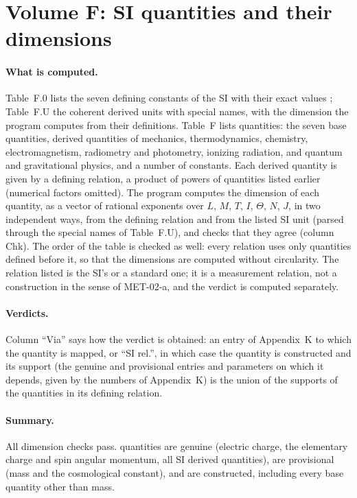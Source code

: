 \section{Volume F: SI quantities and their dimensions}\label{app:f}

\paragraph{What is computed.} Table~F.0 lists the seven defining constants of the SI with their exact values \citep{BIPM2019}; Table~F.U the coherent derived units with special names, with the dimension the program computes from their definitions. Table~F lists \vvNF{} quantities: the seven base quantities, derived quantities of mechanics, thermodynamics, chemistry, electromagnetism, radiometry and photometry, ionizing radiation, and quantum and gravitational physics, and a number of constants. Each derived quantity is given by a defining relation, a product of powers of quantities listed earlier (numerical factors omitted). The program computes the dimension of each quantity, as a vector of rational exponents over $L$, $M$, $T$, $I$, $\Theta$, $N$, $J$, in two independent ways, from the defining relation and from the listed SI unit (parsed through the special names of Table~F.U), and checks that they agree (column Chk). The order of the table is checked as well: every relation uses only quantities defined before it, so that the dimensions are computed without circularity. The relation listed is the SI's or a standard one; it is a measurement relation, not a construction in the sense of MET-02-a, and the verdict is computed separately.

\paragraph{Verdicts.} Column \enquote{Via} says how the verdict is obtained: an entry of Appendix~K to which the quantity is mapped, or \enquote{SI rel.}, in which case the quantity is constructed and its support (the genuine and provisional entries and parameters on which it depends, given by the numbers of Appendix~K) is the union of the supports of the quantities in its defining relation.

\paragraph{Summary.} All \vvNF{} dimension checks pass. \vvNFgenuine{} quantities are genuine (electric charge, the elementary charge and spin angular momentum, all SI derived quantities), \vvNFprov{} are provisional (mass and the cosmological constant), and \vvNFcons{} are constructed, including every base quantity other than mass.

